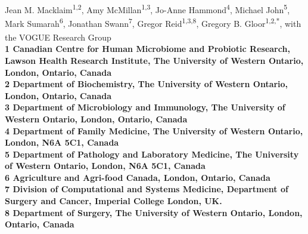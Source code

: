 \documentclass[10pt,letterpaper]{article}
\date{}
\begin{document}
\vspace*{0.35in}

\begin{flushleft}
{\Large
\textbf{}
}
\newline
\\
Jean M. Macklaim\textsuperscript{1,2},
Amy McMillan\textsuperscript{1,3},
Jo-Anne Hammond\textsuperscript{4},
Michael John\textsuperscript{5},
Mark Sumarah\textsuperscript{6},
Jonathan Swann\textsuperscript{7},
Gregor Reid\textsuperscript{1,3,8},
Gregory B. Gloor\textsuperscript{1,2,*},
with the VOGUE Research Group\textsuperscript{\textpilcrow}
\\
\bigskip
\bf{1} Canadian Centre for Human Microbiome and Probiotic Research, Lawson Health Research Institute, The University of Western Ontario, London, Ontario, Canada
\\
\bf{2} Department of Biochemistry, The University of Western Ontario, London, Ontario, Canada
\\
\bf{3} Department of Microbiology and Immunology, The University of Western Ontario, London, Ontario, Canada
\\
\bf{4} Department of Family Medicine, The University of Western Ontario, London, N6A 5C1, Canada
\\
\bf{5} Department of Pathology and Laboratory Medicine, The University of Western Ontario, London, N6A 5C1, Canada
\\
\bf{6} Agriculture and Agri-food Canada, London, Ontario, Canada
\\
\bf{7} Division of Computational and Systems Medicine, Department of Surgery and Cancer, Imperial College London, UK.
\\
\bf{8} Department of Surgery, The University of Western Ontario, London, Ontario, Canada
\\
\bigskip

% 
%


\end{flushleft}
\end{document}
